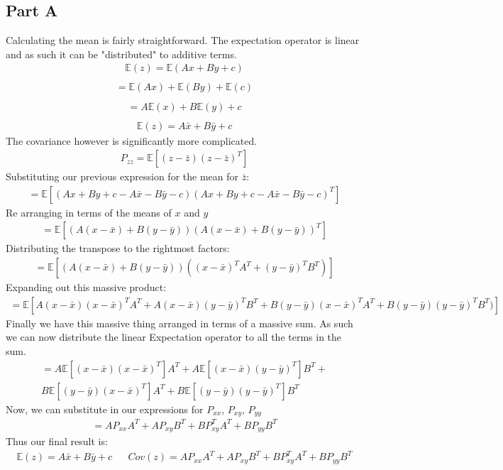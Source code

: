 \documentclass{article}
\begin{document}
\subsection*{Part A}
Calculating the mean is fairly straightforward. The expectation operator is linear and as such it can be "distributed" to additive terms.
\begin{align*}
\mathbb{E}(z) = \mathbb{E}(Ax + By +c)\\
\end{align*}
\begin{align*}
= \mathbb{E}(Ax) +\mathbb{E}(By) +\mathbb{E}(c)\\ 
\end{align*}
\begin{align*}
= A \mathbb{E}(x) + B\mathbb{E}(y)+c\\
\end{align*}
\begin{align*}
\boxed{ \mathbb{E}(z) = A\bar{x} + B\bar{y} + c }
\end{align*}
The covariance however is significantly more complicated.
\begin{align*}
P_{zz} = \mathbb{E}[(z - \bar{z})(z - \bar{z})^T]
\end{align*}
Substituting our previous expression for the mean for $\bar{z}$:
\begin{align*}
 = \mathbb{E}[(Ax + By +c - A\bar{x} -B\bar{y} -c)(Ax +By +c - A\bar{x} -B\bar{y} -c)^T]
\end{align*}
Re arranging in terms of the means of $x$ and $y$
\begin{align*}
= \mathbb{E}[(A(x-\bar{x}) + B(y-\bar{y}))(A(x-\bar{x}) + B(y-\bar{y} ))^T]
\end{align*}
Distributing the transpose to the rightmost factors:
\begin{align*}
= \mathbb{E}[(A(x-\bar{x}) + B(y-\bar{y} ) )((x-\bar{x})^TA^T + (y-\bar{y} )^TB^T )] 
\end{align*}
Expanding out this massive product:
\begin{align*}
= \mathbb{E}[ A(x-\bar{x})(x-\bar{x})^TA^T + A(x-\bar{x})(y - \bar{y})^TB^T + B(y-\bar{y} )(x-\bar{x})^TA^T + B(y-\bar{y} )(y-\bar{y} )^TB^T )]
\end{align*}
Finally we have this massive thing arranged in terms of a massive sum. As such we can now distribute the linear Expectation operator to all the terms in the sum.
\begin{align*}
= A\mathbb{E}[(x-\bar{x})(x-\bar{x})^T]A^T + A\mathbb{E}[(x-\bar{x})(y - \bar{y})^T]B^T + \\ B\mathbb{E}[(y-\bar{y} )(x-\bar{x})^T ]A^T + B\mathbb{E}[(y-\bar{y} )(y-\bar{y} )^T ]B^T
\end{align*}
Now, we can substitute in our expressions for $P_{xx}$, $P_{xy}$, $P_{yy}$
\begin{align*}
= AP_{xx}A^T + AP_{xy}B^T + BP_{xy}^TA^T + BP_{yy}B^T
\end{align*}
Thus our final result is:
\begin{align*}
\boxed{ \mathbb{E}(z) = A\bar{x} + B\bar{y} + c } && \boxed{Cov(z) = AP_{xx}A^T + AP_{xy}B^T + BP_{xy}^TA^T + BP_{yy}B^T} 
\end{align*}
\end{document}
